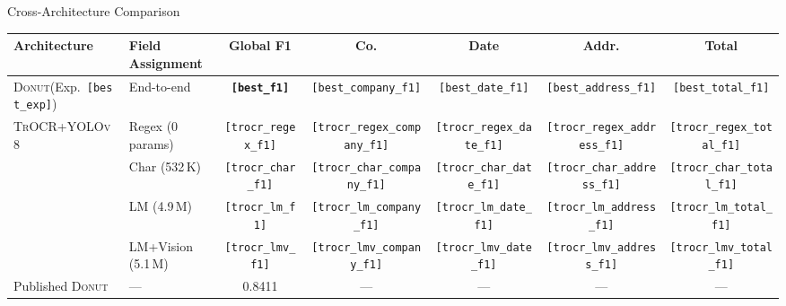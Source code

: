 \documentclass[aspectratio=169,11pt]{beamer}
\newcommand{\VAR}[1]{\texttt{[#1]}\xspace}
\newcommand{\donut}{\textsc{Donut}\xspace}
\newcommand{\trocr}{\textsc{TrOCR}\xspace}
\newcommand{\yolo}{\textsc{YOLOv8}\xspace}
\newcommand{\hlnum}[1]{\textcolor{AccentTeal}{\textbf{#1}}}
\begin{document}
\begin{frame}{Cross-Architecture Comparison}
  \centering
  {\footnotesize
  \begin{tabular}{@{}llccccc@{}}
    \toprule
    \textbf{Architecture} & \textbf{Field Assignment} &
      \textbf{Global F1} &
      \textbf{Co.} & \textbf{Date} & \textbf{Addr.} & \textbf{Total} \\
    \midrule
    \donut (Exp.~\VAR{best_exp})
      & End-to-end
      & \hlnum{\VAR{best_f1}}
      & \VAR{best_company_f1} & \VAR{best_date_f1}
      & \VAR{best_address_f1} & \VAR{best_total_f1} \\
    \midrule
    \multirow{4}{*}{\trocr+\yolo}
      & Regex (0\,params)
      & \VAR{trocr_regex_f1}
      & \VAR{trocr_regex_company_f1} & \VAR{trocr_regex_date_f1}
      & \VAR{trocr_regex_address_f1} & \VAR{trocr_regex_total_f1} \\
    & Char (532\,K)
      & \VAR{trocr_char_f1}
      & \VAR{trocr_char_company_f1} & \VAR{trocr_char_date_f1}
      & \VAR{trocr_char_address_f1} & \VAR{trocr_char_total_f1} \\
    & LM (4.9\,M)
      & \VAR{trocr_lm_f1}
      & \VAR{trocr_lm_company_f1} & \VAR{trocr_lm_date_f1}
      & \VAR{trocr_lm_address_f1} & \VAR{trocr_lm_total_f1} \\
    & LM+Vision (5.1\,M)
      & \VAR{trocr_lmv_f1}
      & \VAR{trocr_lmv_company_f1} & \VAR{trocr_lmv_date_f1}
      & \VAR{trocr_lmv_address_f1} & \VAR{trocr_lmv_total_f1} \\
    \midrule
    Published \donut & --- & 0.8411 & --- & --- & --- & --- \\
    \bottomrule
  \end{tabular}
  }


\end{frame}
\end{document}

